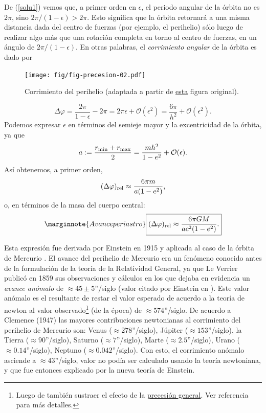 De (\ref{solu1}) vemos que, a primer orden en $\epsilon$, el periodo angular de la órbita no es $2\pi$, sino $2\pi/(1-\epsilon)>2\pi$. Esto significa que la órbita retornará a una misma distancia dada del centro de fuerzas (por ejemplo, el perihelio) sólo luego de realizar algo más que una rotación completa en torno al centro de fuerzas, en un ángulo de $2\pi/(1-\epsilon)$. En otras palabras, el \textit{corrimiento angular} de la órbita es dado por
\begin{figure}[H]
 \begin{center}
\texttt{[image: fig/fig-precesion-02.pdf]}
\caption{Corrimiento del perihelio (adaptada a partir de \href{http://en.wikipedia.org/wiki/File:Perihelion_precession.svg}{esta} figura original).}
\end{center}
\end{figure}
\begin{equation}
\Delta\varphi=\frac{2\pi}{1-\epsilon}-2\pi=2\pi\epsilon+\mathcal{O}(\epsilon^2)=\frac{6\pi}{h^2}+\mathcal{O}(\epsilon^2).
\end{equation}
Podemos expresar $\epsilon$ en términos del semieje mayor y la excentricidad de la órbita, ya que
\begin{equation}
a:=\frac{r_{\rm min}+r_{\rm max}}{2}=\frac{mh^2}{1-e^2}+\mathcal{O}(\epsilon).
\end{equation}
Así obtenemos, a primer orden,
\begin{equation}
 (\Delta\varphi)_{\rm rel}\approx\frac{6\pi m}{a(1-e^2)},
\end{equation}
o, en términos de la masa del cuerpo central:
\begin{equation}\marginnote{Avance periastro}
 \boxed{(\Delta\varphi)_{\rm rel}\approx \frac{6\pi GM}{ac^2(1-e^2)}.}
\end{equation}

Esta expresión fue derivada por Einstein en 1915 y aplicada al caso de la órbita de Mercurio \cite{Einstein15}. El avance del perihelio de Mercurio era un fenómeno conocido antes de la formulación de la teoría de la Relatividad General, ya que Le Verrier \cite{LeVerrier} publicó en 1859 sus observaciones y cálculos en los que dejaba en evidencia un \textit{avance anómalo} de $\approx 45\pm 5$''/siglo  (valor citado por Einstein en \cite{Einstein15}). Este valor anómalo es el resultante de restar el valor esperado de acuerdo a la teoría de newton al valor observado\footnote{Luego de también sustraer el efecto de la \href{http://en.wikipedia.org/wiki/Axial_precession}{precesión general}. Ver referencia \cite{Clemence47} para más detalles.} (de la época) de $\approx 574$''/siglo.  De acuerdo a Clemence (1947) \cite{Clemence47} las mayores contribuciones newtonianas al corrimiento del perihelio de Mercurio son: Venus ($\approx 278$''/siglo), Júpiter ($\approx 153$''/siglo), la Tierra ($\approx 90$''/siglo), Saturno ($\approx 7$''/siglo), Marte ($\approx 2.5$''/siglo), Urano ($\approx 0.14$''/siglo), Neptuno ($\approx 0.042$''/siglo). Con esto, el corrimiento anómalo asciende a $\approx 43$''/siglo, valor no podía ser calculado usando la teoría newtoniana, y que fue entonces explicado por la nueva teoría de Einstein.

